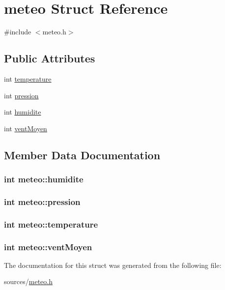 \hypertarget{structmeteo}{\section{meteo Struct Reference}
\label{structmeteo}
}


{\ttfamily \#include $<$meteo.\-h$>$}

\subsection*{Public Attributes}
\begin{DoxyCompactItemize}
\item 
int \hyperlink{structmeteo_a07007b8c7fb0396c73d76fdb9c905a96}{temperature}
\item 
int \hyperlink{structmeteo_aaadb5231bc3e08e2502bcab0ffc25ca4}{pression}
\item 
int \hyperlink{structmeteo_a2e82e2624bd5a27591ccd26eb6fb7f88}{humidite}
\item 
int \hyperlink{structmeteo_a51cfc84290c4704cca1c6742961e0a2f}{vent\-Moyen}
\end{DoxyCompactItemize}


\subsection{Member Data Documentation}
\hypertarget{structmeteo_a2e82e2624bd5a27591ccd26eb6fb7f88}{
\subsubsection[{humidite}]{\setlength{\rightskip}{0pt plus 5cm}int meteo\-::humidite}}\label{structmeteo_a2e82e2624bd5a27591ccd26eb6fb7f88}
\hypertarget{structmeteo_aaadb5231bc3e08e2502bcab0ffc25ca4}{
\subsubsection[{pression}]{\setlength{\rightskip}{0pt plus 5cm}int meteo\-::pression}}\label{structmeteo_aaadb5231bc3e08e2502bcab0ffc25ca4}
\hypertarget{structmeteo_a07007b8c7fb0396c73d76fdb9c905a96}{
\subsubsection[{temperature}]{\setlength{\rightskip}{0pt plus 5cm}int meteo\-::temperature}}\label{structmeteo_a07007b8c7fb0396c73d76fdb9c905a96}
\hypertarget{structmeteo_a51cfc84290c4704cca1c6742961e0a2f}{
\subsubsection[{vent\-Moyen}]{\setlength{\rightskip}{0pt plus 5cm}int meteo\-::vent\-Moyen}}\label{structmeteo_a51cfc84290c4704cca1c6742961e0a2f}


The documentation for this struct was generated from the following file\-:\begin{DoxyCompactItemize}
\item 
sources/\hyperlink{meteo_8h}{meteo.\-h}\end{DoxyCompactItemize}
